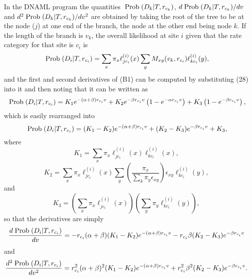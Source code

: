 \documentclass[12pt]{article}
\begin{document}
In the DNAML program the
quantities ${\rm\;Prob\;}(D_k|T, r_{c_k})$, $d{\rm\;Prob\;}(D_k|T, r_{c_k})/dv$ and $d^2{\rm\;Prob\;}(D_k|T, r_{c_k}) /dv^2$
are obtained by taking the root of the tree to be at the node ($j$) at
one end of the branch, the node at the other end being node $k$.  If the
length of the branch is $v_k$, the overall likelihood at site $i$ given
that the rate category for that site is $c_i$ is
\begin{equation} %
\prob(D_i|T, r_{c_i}) = \sum_x  \pi_x \ell_{jc_i}^{(i)}(x) \sum_y M_{xy}(v_k, r_{c_i}) \ell_{kc_i}^{(i)}(y),
\end{equation}
\noindent
and the first and second derivatives of (B1) can be computed by substituting
(28) into it and then noting that it can be written as
\begin{equation} %
\prob(D_i|T, r_{c_i}) = K_1 e^{-(\alpha+\beta) r_{c_i} v} + K_2 e^{-\beta r_{c_i} v}\left(1 - e^{-\alpha r_{c_i} v}\right) + K_3 \left(1 - e^{-\beta r_{c_i} v}\right),
\end{equation}
\noindent
which is easily rearranged into
\begin{equation} %
\prob(D_i|T, r_{c_i}) = (K_1-K_2) e^{-(\alpha+\beta) r_{c_i} v} + (K_2-K_3) e^{-\beta r_{c_i} v} + K_3,
\end{equation}
\noindent
where
\begin{equation} %
K_1 = \sum_x  \pi_x \ell_{jc_i}^{(i)}(x) \ell_{kc_i}^{(i)}(x),
\end{equation}
\begin{equation} %
K_2 = \sum_x  \pi_x \ell_{jc_i}^{(i)}(x) \sum_y \left(\frac{\pi_x}{\sum_k \pi_y \epsilon_{xy}}\right) \epsilon_{xy} \ell_{kc_i}^{(i)}(y),
\end{equation}
and
\begin{equation} %
K_3 = \left(\sum_x  \pi_x \ell_{jc_i}^{(i)}(x)\right)
\left(\sum_y  \pi_y \ell_{kc_i}^{(i)}(y)\right),
\end{equation}
\noindent
so that the derivatives are simply
\begin{equation} %
{d\prob(D_i|T, r_{c_i}) \over dv} = - r_{c_i} (\alpha+\beta) (K_1-K_2) e^{-(\alpha+\beta) r_{c_i} v} - r_{c_i}  \beta (K_2-K_3) e^{-\beta r_{c_i} v}
\end{equation}
and
\noindent
\begin{equation} %
{d^2\prob(D_i|T, r_{c_i}) \over dv^2}  = r_{c_i}^2 (\alpha+\beta)^2 (K_1-K_2) e^{-(\alpha+\beta) r_{c_i} v} +r_{c_i}^2 \beta^2 (K_2-K_3) e^{-\beta r_{c_i} v}.
\end{equation}
\newpage
\end{document}
